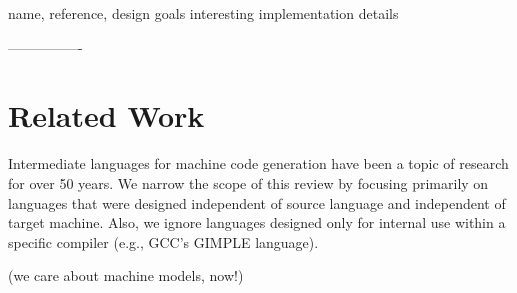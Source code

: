 name, reference,
design goals
interesting implementation details

----------------

\section{Related Work}

Intermediate languages for machine code generation have been a topic of research
for over 50 years. We narrow the scope of this review by
focusing primarily on languages that were designed independent of source language
and independent of target machine. Also, we ignore languages designed
only for internal use within a specific compiler (e.g., GCC's GIMPLE language).

(we care about machine models, now!)
